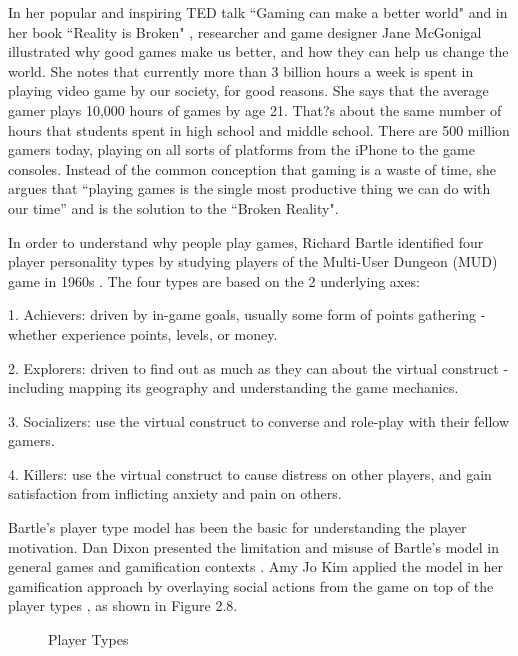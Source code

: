 In her popular and inspiring TED talk ``Gaming can make a better world" \cite {mcgonigal2010ted} and in her book ``Reality is Broken" \cite {mcgonigal2011reality}, researcher and game designer Jane McGonigal illustrated why good games make us better, and how they can help us change the world. She notes that currently more than 3 billion hours a week is spent in playing video game by our society, for good reasons. She says that the average gamer plays 10,000 hours of games by age 21. That?s about the same number of hours that students spent in high school and middle school. There are 500 million gamers today, playing on all sorts of platforms from the iPhone to the game consoles. Instead of the common conception that gaming is a waste of time, she argues that ``playing games is the single most productive thing we can do with our time'' and is the solution to the ``Broken Reality". 

In order to understand why people play games, Richard Bartle identified four player personality types by studying players of the Multi-User Dungeon (MUD) game in 1960s \cite {bartle1996hearts}. The four types are based on the 2 underlying axes:

1. Achievers: driven by in-game goals, usually some form of points gathering - whether experience points, levels, or money.

2. Explorers:  driven to find out as much as they can about the virtual construct - including mapping its geography and understanding the game mechanics.

3. Socializers: use the virtual construct to converse and role-play with their fellow gamers.

4. Killers: use the virtual construct to cause distress on other players, and gain satisfaction from inflicting anxiety and pain on others.

Bartle's player type model has been the basic for understanding the player motivation. Dan Dixon presented the limitation and misuse of Bartle's model in general games and gamification contexts \cite{DixonPlayerType}. Amy Jo Kim applied the model in her gamification approach by overlaying social actions from the game on top of the player types \cite {Kim2010}, as shown in Figure 2.8.

\begin{figure}[htbp]
	\centering
		\caption{Player Types}
		\label{fig:play-types}
\end{figure}

